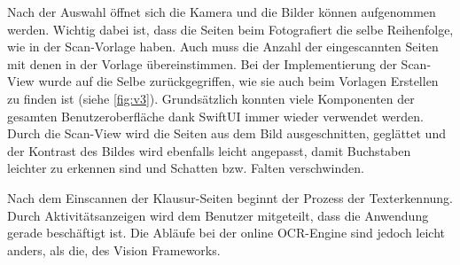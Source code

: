 \documentclass[notables, nomenclature, oneside, 150]{HSMW-Thesis}
\begin{document}
			Nach der Auswahl öffnet sich die Kamera und die Bilder können aufgenommen werden. Wichtig dabei ist, dass die Seiten beim Fotografiert die selbe Reihenfolge, wie in der Scan-Vorlage haben. Auch muss die Anzahl der eingescannten Seiten mit denen in der Vorlage übereinstimmen. Bei der Implementierung der Scan-View wurde auf die Selbe zurückgegriffen, wie sie auch beim Vorlagen Erstellen zu finden ist (siehe \ref{fig:v3}). Grundsätzlich konnten viele Komponenten der gesamten Benutzeroberfläche dank SwiftUI immer wieder verwendet werden. Durch die Scan-View wird die Seiten aus dem Bild ausgeschnitten, geglättet und der Kontrast des Bildes wird ebenfalls leicht angepasst, damit Buchstaben leichter zu erkennen sind und Schatten bzw. Falten verschwinden.
			
			Nach dem Einscannen der Klausur-Seiten beginnt der Prozess der Texterkennung. Durch Aktivitätsanzeigen wird dem Benutzer mitgeteilt, dass die Anwendung gerade beschäftigt ist. Die Abläufe bei der online OCR-Engine sind jedoch leicht anders, als die, des Vision Frameworks.
\end{document}
